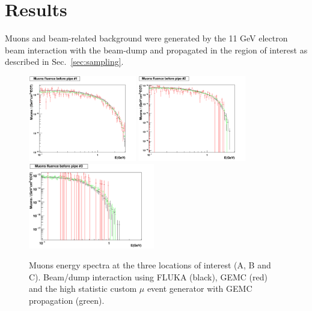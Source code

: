 \section{Results}\label{sec:results}

Muons and beam-related background  were generated by the 11 GeV electron beam interaction with the beam-dump and propagated in the region of interest as described in  Sec.~\ref{sec:sampling}. 

\begin{figure}[h!] 
\center
\includegraphics[width=4.7cm]{figs/comparisonMuonsPipe1_1D.pdf}
\includegraphics[width=4.7cm]{figs/comparisonMuonsPipe2_1D.pdf}
\includegraphics[width=5.5cm]{figs/comparisonMuonsPipe3_1D.pdf}
\caption{Muons energy spectra at the three locations of interest (A, B and C). Beam/dump interaction using  FLUKA (black), GEMC (red) and the high statistic custom $\mu$ event generator with GEMC propagation (green).}
\label{fig:mu-comp}
\end{figure}


